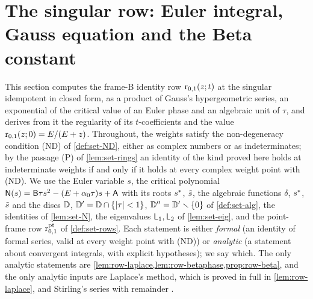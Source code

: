 \providecommand{\kE}{k_E}                              %
\providecommand{\kph}{\kappa_{\mathrm{ph}}}            %
\providecommand{\Lt}{\Lnorm_{\tau}}                    %
\providecommand{\Ngauss}{\Nlap_{\mathrm{G}}}            %
\providecommand{\Spht}{\mathsf{S}_{\phi,\tau}}              %
\providecommand{\Sphtt}{\mathsf{S}_{\phi,\tau\tau}}         %
\providecommand{\Abetam}[1]{\mathsf{A}_{\beta,#1}}         %
\providecommand{\Bfn}{\mathrm{B}}                      %
\section{The singular row: Euler integral, Gauss equation and the Beta constant}
\label{sec:row}

This section computes the frame-B identity row $\mathrm{r}_{0,1}(z;t)$ at the singular idempotent in closed form, as a product of Gauss's hypergeometric series, an exponential of the critical value of an Euler phase and an algebraic unit of $\tau$, and derives from it the regularity of its $t$-coefficients and the value $\mathrm{r}_{0,1}(z;0)=E/(E+z)$. Throughout, the weights satisfy the non-degeneracy condition (ND) of \cref{def:set-ND}, either as complex numbers or as indeterminates; by the passage (P) of \cref{lem:set-rings} an identity of the kind proved here holds at indeterminate weights if and only if it holds at every complex weight point with (ND). We use the Euler variable $s$, the critical polynomial $\mathsf{N}(s)=\mathsf{B}\tau s^2-(E+\alpha_0\tau)s+\mathsf{A}$ with its roots $s^{\ast}$, $\tilde{s}$, the algebraic functions $\delta$, $s^{\ast}$, $\tilde{s}$ and the discs $\mathbb{D}$, $\mathbb{D}'=\mathbb{D}\cap\{|\tau|<1\}$, $\mathbb{D}''=\mathbb{D}'\smallsetminus\{0\}$ of \cref{def:set-alg}, the identities of \cref{lem:set-N}, the eigenvalues $\mathsf{L}_1,\mathsf{L}_2$ of \cref{lem:set-eig}, and the point-frame row $\mathrm{r}^{\mathrm{pt}}_{0,1}$ of \cref{def:set-rows}. Each statement is either \emph{formal} (an identity of formal series, valid at every weight point with (ND)) or \emph{analytic} (a statement about convergent integrals, with explicit hypotheses); we say which. The only analytic statements are \cref{lem:row-laplace,lem:row-betaphase,prop:row-beta}, and the only analytic inputs are Laplace's method, which is proved in full in \cref{lem:row-laplace}, and Stirling's series with remainder \cite[5.11.1 and Section~5.11(ii)]{DLMF}.

